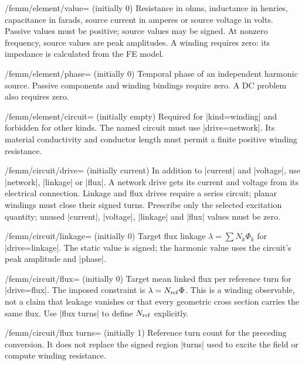 \begin{key}{/femm/element/value= (initially 0)}
Resistance in ohms, inductance in henries, capacitance in farads, source current
in amperes or source voltage in volts. Passive values must be positive; source
values may be signed. At nonzero frequency, source values are peak amplitudes.
A winding requires zero: its impedance is calculated from the FE model.
\end{key}
\begin{key}{/femm/element/phase= (initially 0)}
Temporal phase of an independent harmonic source. Passive components and winding
bindings require zero. A DC problem also requires zero.
\end{key}
\begin{key}{/femm/element/circuit= (initially empty)}
Required for |kind=winding| and forbidden for other kinds. The named circuit
must use |drive=network|. Its material conductivity and conductor length must
permit a finite positive winding resistance.
\end{key}

\begin{key}{/femm/circuit/drive= (initially current)}
In addition to |current| and |voltage|, use |network|, |linkage| or |flux|.
A network drive gets its current and voltage from its electrical connection.
Linkage and flux drives require a series circuit; planar windings must close
their signed turns. Prescribe only the selected excitation quantity; unused
|current|, |voltage|, |linkage| and |flux| values must be zero.
\end{key}
\begin{key}{/femm/circuit/linkage= (initially 0)}
Target flux linkage $\lambda=\sum N_k\Phi_k$ for |drive=linkage|. The static value
is signed; the harmonic value uses the circuit's peak amplitude and |phase|.
\end{key}
\begin{key}{/femm/circuit/flux= (initially 0)}
Target mean linked flux per reference turn for |drive=flux|. The imposed
constraint is $\lambda=N_{\rm ref}\Phi$. This is a winding observable, not a
claim that leakage vanishes or that every geometric cross section carries the
same flux. Use |flux turns| to define $N_{\rm ref}$ explicitly.
\end{key}
\begin{key}{/femm/circuit/flux turns= (initially 1)}
Reference turn count for the preceding conversion. It does not replace the
signed region |turns| used to excite the field or compute winding resistance.
\end{key}

